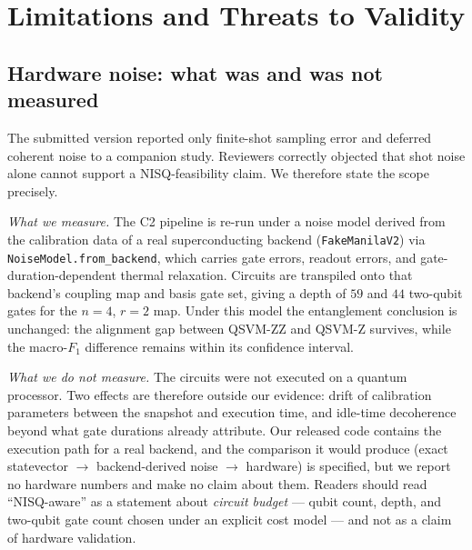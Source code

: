 %
%

\section{Limitations and Threats to Validity}
\label{sec:limitations}

\subsection{Hardware noise: what was and was not measured}

The submitted version reported only finite-shot sampling error and deferred
coherent noise to a companion study. Reviewers correctly objected that shot
noise alone cannot support a NISQ-feasibility claim. We therefore state the
scope precisely.

\emph{What we measure.} The C2 pipeline is re-run under a noise model derived
from the calibration data of a real superconducting backend
(\texttt{FakeManilaV2}) via \texttt{NoiseModel.from\_backend}, which carries
gate errors, readout errors, and gate-duration-dependent thermal relaxation.
Circuits are transpiled onto that backend's coupling map and basis gate set,
giving a depth of $59$ and $44$ two-qubit gates for the $n=4$, $r=2$ map.
Under this model the entanglement conclusion is unchanged: the alignment gap
between QSVM-ZZ and QSVM-Z survives, while the macro-$F_1$ difference remains
within its confidence interval.

\emph{What we do not measure.} The circuits were not executed on a quantum
processor. Two effects are therefore outside our evidence: drift of calibration
parameters between the snapshot and execution time, and idle-time decoherence
beyond what gate durations already attribute. Our released code contains the
execution path for a real backend, and the comparison it would produce
(exact statevector $\rightarrow$ backend-derived noise $\rightarrow$ hardware)
is specified, but we report no hardware numbers and make no claim about them.
Readers should read ``NISQ-aware'' as a statement about \emph{circuit budget}
--- qubit count, depth, and two-qubit gate count chosen under an explicit cost
model --- and not as a claim of hardware validation.

